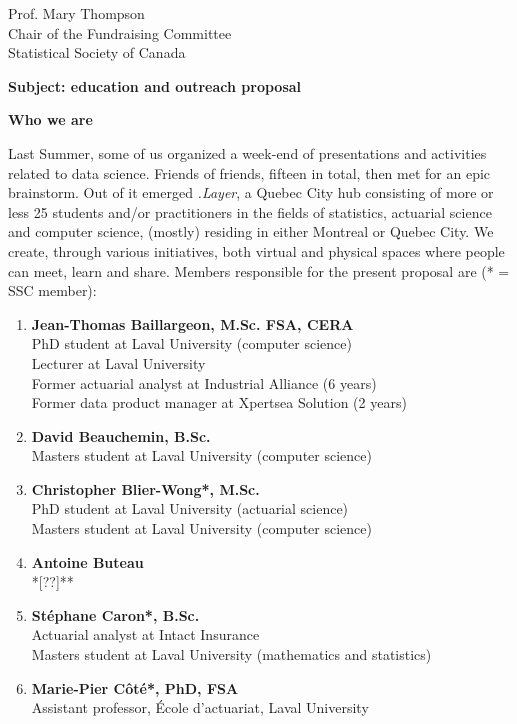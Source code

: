 \documentclass[11pt, a4paper]{letter} %
\begin{document}
\begin{letter}{
	Prof. Mary Thompson\\
	Chair of the Fundraising Committee\\
	Statistical Society of Canada
	
	\bigskip
	\textbf{Subject: education and outreach proposal}%
}
\bigskip
\noindent \textbf{Who we are}

Last Summer, some of us organized a week-end of presentations and activities related to data science. Friends of friends, fifteen in total, then met for an epic brainstorm. %
Out of it emerged \emph{.Layer}, a Quebec City hub consisting of more or less 25 students and/or practitioners in the fields of statistics, actuarial science and computer science, (mostly) residing in either Montreal or Quebec City. We create, through various initiatives, both virtual and physical spaces where people can meet, learn and share. Members responsible for the present proposal are (* = SSC member):
\begin{enumerate}
	\item[] \textbf{Jean-Thomas Baillargeon, M.Sc. FSA, CERA}\\
	\quad PhD student at Laval University (computer science)\\
	\quad Lecturer at Laval University\\
	\quad Former actuarial analyst at Industrial Alliance (6 years)\\
	\quad Former data product manager at Xpertsea Solution (2 years)
	\item[] \textbf{David Beauchemin, B.Sc.}\\
	\quad Masters student at Laval University (computer science)
	\item[] \textbf{Christopher Blier-Wong*, M.Sc.}\\
	\quad PhD student at Laval University (actuarial science)\\
	\quad Masters student at Laval University (computer science)
	\item[] \textbf{Antoine Buteau}\\
	\quad **[??]**
	\item[] \textbf{Stéphane Caron*, B.Sc.}\\
	\quad Actuarial analyst at Intact Insurance\\
	\quad Masters student at Laval University (mathematics and statistics)
	\item[] \textbf{Marie-Pier Côté*, PhD, FSA}\\
	\quad Assistant professor, École d'actuariat, Laval University\\

\end{enumerate}
\end{letter}
\end{document}
